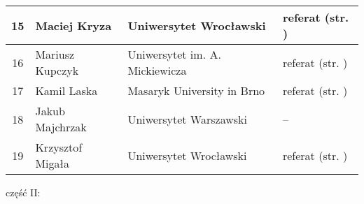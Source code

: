 \documentclass[12pt,oneside]{book}
\begin{document}
\begin{tabular}{||c|l|l|l||}
15 & Maciej Kryza & Uniwersytet Wrocławski & referat (str. \pageref{bilinska}) \\\hline
16 	& Mariusz Kupczyk & Uniwersytet im. A. Mickiewicza & referat (str. \pageref{kupczyk}) \\\hline
17    & Kamil Laska & Masaryk University in Brno & referat (str. \pageref{kendzierski}) \\\hline
18 	 & Jakub Majchrzak & Uniwersytet Warszawski & -- \\\hline	
19	 & Krzysztof Migała & Uniwersytet Wrocławski & referat (str. \pageref{pilguj}) \\\hline

	
\hline
\hline
\end{tabular}


\newpage

\vspace{1cm}

\Large część II:
\end{document}
